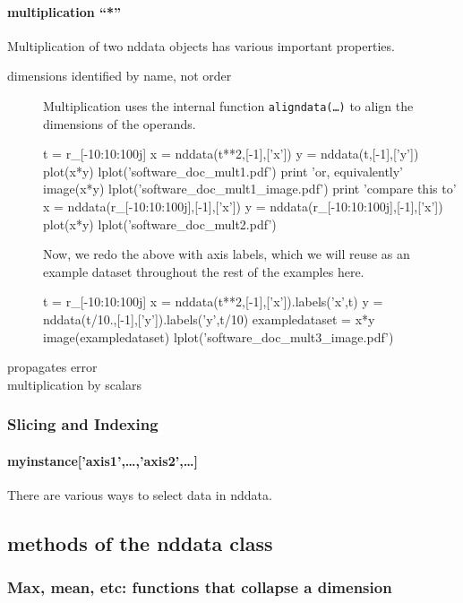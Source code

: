 \paragraph{multiplication ``*''}
Multiplication of two nddata objects has various important properties.
\begin{description}
\item[dimensions identified by name, not order]
Multiplication uses the internal function \texttt{aligndata(\ldots)}
    to align the dimensions of the operands.

\begin{python}
t = r_[-10:10:100j]
x = nddata(t**2,[-1],['x'])
y = nddata(t,[-1],['y'])
plot(x*y)
lplot('software_doc_mult1.pdf')
print 'or, equivalently'
image(x*y)
lplot('software_doc_mult1_image.pdf')
print 'compare this to'
x = nddata(r_[-10:10:100j],[-1],['x'])
y = nddata(r_[-10:10:100j],[-1],['x'])
plot(x*y)
lplot('software_doc_mult2.pdf')
\end{python}

Now, we redo the above with axis labels,
    which we will reuse as an example dataset
    throughout the rest of the examples here.

\begin{python}
t = r_[-10:10:100j]
x = nddata(t**2,[-1],['x']).labels('x',t)
y = nddata(t/10.,[-1],['y']).labels('y',t/10)
exampledataset = x*y
image(exampledataset)
lplot('software_doc_mult3_image.pdf')
\end{python}
\item[propagates error]
\nts{\ldots}
\item[multiplication by scalars]
\nts{\ldots}
\end{description}
\subsubsection{Slicing and Indexing}
\paragraph{myinstance['axis1',\ldots,'axis2',\ldots]}
There are various ways to select data in nddata.

\subsection{methods of the nddata class}
\subsubsection{Max, mean, etc: functions that collapse a dimension}
